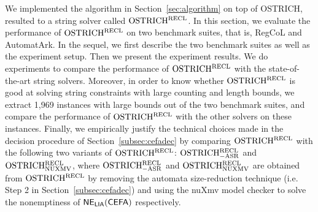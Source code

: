 
We implemented the algorithm in Section~\ref{sec:algorithm} on top of OSTRICH, resulted to a string solver called $\rm OSTRICH^{RECL}$. 
%
In this section, we evaluate the performance of $\rm OSTRICH^{RECL}$ on two benchmark suites, that is, RegCoL and AutomatArk. In the sequel, we first describe the two benchmark suites as well as the experiment setup. Then we present the experiment results. 
We do experiments to compare the performance of $\rm OSTRICH^{RECL}$ with the state-of-the-art string solvers. Moreover, in order to know whether $\rm OSTRICH^{RECL}$ is good at solving string constraints with large counting and length bounds, we extract 1,969 instances with large bounds out of the two benchmark suites, and compare the performance of $\rm OSTRICH^{RECL}$ with the other solvers on these instances. Finally, we empirically justify the technical choices made in the decision procedure of Section~\ref{subsec:cefadec} by comparing $\rm OSTRICH^{RECL}$ with the following two variants of $\rm OSTRICH^{RECL}$: $\rm OSTRICH^{RECL}_{\rm - ASR}$ and $\rm OSTRICH^{RECL}_{\rm NUXMV}$, where $\rm OSTRICH^{RECL}_{\rm - ASR}$ and $\rm OSTRICH^{RECL}_{\rm NUXMV}$ are obtained from $\rm OSTRICH^{RECL}$ by removing the automata size-reduction technique (i.e. Step 2 in Section~\ref{subsec:cefadec}) and using the nuXmv model checker to solve the nonemptiness of ${\sf NE_{LIA}(CEFA)}$ respectively. 
 




